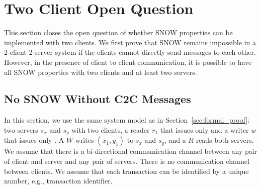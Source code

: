 \section{Two Client Open Question}
\label{sec:2c2s}
This section closes the open question of whether SNOW properties can be implemented with two clients. We first prove that SNOW remains impossible in a 2-client 2-server system if the clients cannot directly send messages to each other.
 However, in the presence of client to client communication, it is possible to have all SNOW properties with two clients and at least two servers.
 
 \subsection{No  SNOW Without C2C  Messages}
 \label{subsec:no_snow_no_c2c}
 In this section, we use the same system model as in Section~\ref{sec:formal_proof}: two servers $s_x$ and $s_y$ with two clients, a reader $r_1$ that issues only 
\rots{} and a writer $w$ that issues only \wots{}. A \wot{} $W$ writes $(x_1, y_1)$ to $s_x$ and $s_y$, and a \rot{} $R$ reads both servers. We assume that there is a bi-directional communication channel between any pair of client and server and any pair of servers. There is no communication channel between clients. We assume that each transaction can be identified by a unique number, e.g., transaction identifier. 

